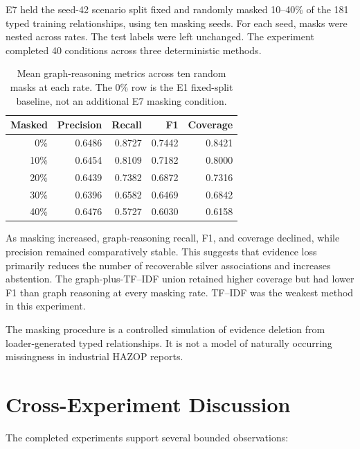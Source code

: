 E7 held the seed-42 scenario split fixed and randomly masked 10--40\% of
the 181 typed training relationships, using ten masking seeds. For each
seed, masks were nested across rates. The test labels were left unchanged.
The experiment completed 40 conditions across three deterministic methods.

\begin{table}[htbp]
\centering
\caption[E7 graph reasoning under evidence masking]{Mean graph-reasoning
metrics across ten random masks at each rate. The 0\% row is the E1
fixed-split baseline, not an additional E7 masking condition.}
\label{tab:w4-e7}
\small
\begin{tabularx}{\textwidth}{@{}rrrrr@{}}
\toprule
\textbf{Masked} & \textbf{Precision} & \textbf{Recall} &
\textbf{F1} & \textbf{Coverage} \\
\midrule
0\% & 0.6486 & 0.8727 & 0.7442 & 0.8421 \\
10\% & 0.6454 & 0.8109 & 0.7182 & 0.8000 \\
20\% & 0.6439 & 0.7382 & 0.6872 & 0.7316 \\
30\% & 0.6396 & 0.6582 & 0.6469 & 0.6842 \\
40\% & 0.6476 & 0.5727 & 0.6030 & 0.6158 \\
\bottomrule
\end{tabularx}
\end{table}

As masking increased, graph-reasoning recall, F1, and coverage declined,
while precision remained comparatively stable. This suggests that evidence
loss primarily reduces the number of recoverable silver associations and
increases abstention. The graph-plus-TF--IDF union retained higher coverage
but had lower F1 than graph reasoning at every masking rate. TF--IDF was
the weakest method in this experiment.

The masking procedure is a controlled simulation of evidence deletion from
loader-generated typed relationships. It is not a model of naturally
occurring missingness in industrial HAZOP reports.

\section{Cross-Experiment Discussion}

The completed experiments support several bounded observations:

